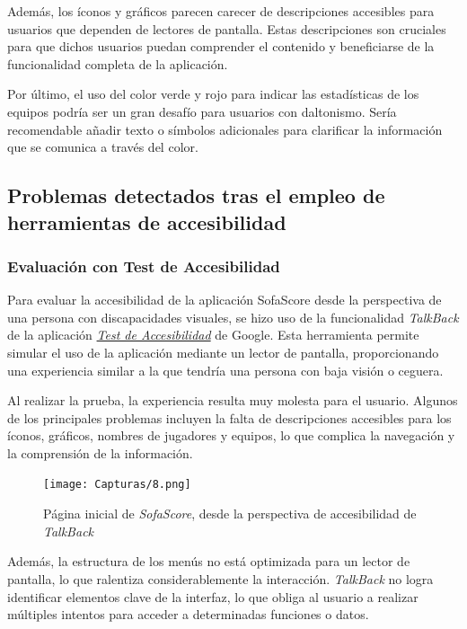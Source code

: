 \documentclass[]{article}
\begin{document}
Además, los íconos y gráficos parecen carecer de descripciones accesibles para usuarios que dependen de lectores de pantalla. Estas descripciones son cruciales para que dichos usuarios puedan comprender el contenido y beneficiarse de la funcionalidad completa de la aplicación.

Por último, el uso del color verde y rojo para indicar las estadísticas de los equipos podría ser un gran desafío para usuarios con daltonismo. Sería recomendable añadir texto o símbolos adicionales para clarificar la información que se comunica a través del color.

\subsection{Problemas detectados tras el empleo de herramientas de accesibilidad}

\subsubsection{Evaluación con Test de Accesibilidad}

Para evaluar la accesibilidad de la aplicación SofaScore desde la perspectiva de una persona con discapacidades visuales, se hizo uso de la funcionalidad \textit{TalkBack} de la aplicación \textit{\href{https://play.google.com/store/apps/details?id=com.google.android.apps.accessibility.auditor&pcampaignid=web_share}{Test de Accesibilidad}} de Google. Esta herramienta permite simular el uso de la aplicación mediante un lector de pantalla, proporcionando una experiencia similar a la que tendría una persona con baja visión o ceguera. 

Al realizar la prueba, la experiencia resulta muy molesta para el usuario. Algunos de los principales problemas incluyen la falta de descripciones accesibles para los íconos, gráficos, nombres de jugadores y equipos, lo que complica la navegación y la comprensión de la información.

\begin{figure}[H] %
	\centering
	\texttt{[image: Capturas/8.png]}
	\caption{Página inicial de \textit{SofaScore}, desde la perspectiva de accesibilidad de \textit{TalkBack}}
	\label{fig:etiqueta}
\end{figure}


Además, la estructura de los menús no está optimizada para un lector de pantalla, lo que ralentiza considerablemente la interacción. \textit{TalkBack} no logra identificar elementos clave de la interfaz, lo que obliga al usuario a realizar múltiples intentos para acceder a determinadas funciones o datos. 
\end{document}
